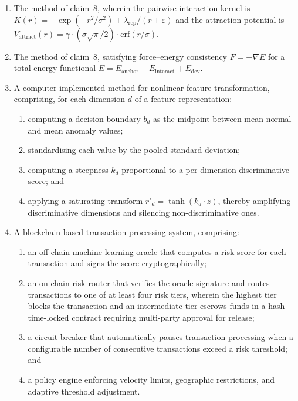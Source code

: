 \documentclass[12pt,a4paper]{article}
\begin{document}
\begin{enumerate}[label=\textbf{\arabic*.}, leftmargin=2em]
\item The method of claim~8, wherein the pairwise interaction kernel is
$K(r) = -\exp(-r^2/\sigma^2) + \lambda_{\mathrm{rep}}/(r + \varepsilon)$ and
the attraction potential is
$V_{\mathrm{attract}}(r) = \gamma \cdot (\sigma\sqrt{\pi}/2) \cdot
\mathrm{erf}(r/\sigma)$.

\item The method of claim~8, satisfying force--energy consistency
$F = -\nabla E$ for a total energy functional
$E = E_{\mathrm{anchor}} + E_{\mathrm{interact}} + E_{\mathrm{dev}}$.

\item A computer-implemented method for nonlinear feature transformation,
comprising, for each dimension $d$ of a feature representation:
\begin{enumerate}[label=(\alph*)]
  \item computing a decision boundary $b_d$ as the midpoint between mean
    normal and mean anomaly values;
  \item standardising each value by the pooled standard deviation;
  \item computing a steepness $k_d$ proportional to a per-dimension
    discriminative score; and
  \item applying a saturating transform $r'_d = \tanh(k_d \cdot z)$,
    thereby amplifying discriminative dimensions and silencing
    non-discriminative ones.
\end{enumerate}

\item A blockchain-based transaction processing system, comprising:
\begin{enumerate}[label=(\alph*)]
  \item an off-chain machine-learning oracle that computes a risk score for
    each transaction and signs the score cryptographically;
  \item an on-chain risk router that verifies the oracle signature and routes
    transactions to one of at least four risk tiers, wherein the highest tier
    blocks the transaction and an intermediate tier escrows funds in a hash
    time-locked contract requiring multi-party approval for release;
  \item a circuit breaker that automatically pauses transaction processing
    when a configurable number of consecutive transactions exceed a risk
    threshold; and
  \item a policy engine enforcing velocity limits, geographic restrictions,
    and adaptive threshold adjustment.
\end{enumerate}


\end{enumerate}
\end{document}

